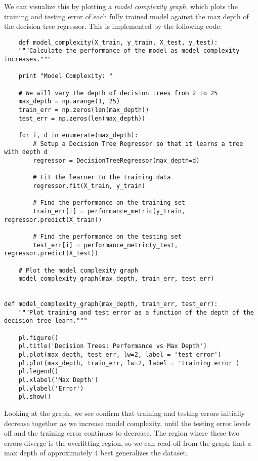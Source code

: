 \documentclass[12 pt]{article}
\numberwithin{equation}{section}
\begin{document}
We can visualize this by plotting a \emph{model complexity graph}, which plots the training and testing error of each fully trained model against the max depth of the decision tree regressor. This is implemented by the following code:

\begin{verbatim}
	def model_complexity(X_train, y_train, X_test, y_test):
    """Calculate the performance of the model as model complexity increases."""

    print "Model Complexity: "

    # We will vary the depth of decision trees from 2 to 25
    max_depth = np.arange(1, 25)
    train_err = np.zeros(len(max_depth))
    test_err = np.zeros(len(max_depth))

    for i, d in enumerate(max_depth):
        # Setup a Decision Tree Regressor so that it learns a tree with depth d
        regressor = DecisionTreeRegressor(max_depth=d)

        # Fit the learner to the training data
        regressor.fit(X_train, y_train)

        # Find the performance on the training set
        train_err[i] = performance_metric(y_train, regressor.predict(X_train))

        # Find the performance on the testing set
        test_err[i] = performance_metric(y_test, regressor.predict(X_test))

    # Plot the model complexity graph
    model_complexity_graph(max_depth, train_err, test_err)


def model_complexity_graph(max_depth, train_err, test_err):
    """Plot training and test error as a function of the depth of the decision tree learn."""

    pl.figure()
    pl.title('Decision Trees: Performance vs Max Depth')
    pl.plot(max_depth, test_err, lw=2, label = 'test error')
    pl.plot(max_depth, train_err, lw=2, label = 'training error')
    pl.legend()
    pl.xlabel('Max Depth')
    pl.ylabel('Error')
    pl.show()
\end{verbatim}

Looking at the graph, we see confirm that training and testing errors initially decrease together as we increase model complexity, until the testing error levels off and the training error continues to decrease. The region where these two errors diverge is the overfitting region, so we can read off from the graph that a max depth of approximately 4 best generalizes the dataset.
\end{document}

